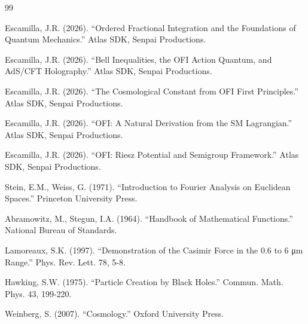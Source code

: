 \documentclass[12pt]{article}
\theoremstyle{definition}
\begin{document}
\begin{thebibliography}{99}

  Escamilla, J.R. (2026).
  ``Ordered Fractional Integration and the Foundations of Quantum Mechanics.''
  Atlas SDK, Senpai Productions.

  Escamilla, J.R. (2026).
  ``Bell Inequalities, the OFI Action Quantum, and AdS/CFT Holography.''
  Atlas SDK, Senpai Productions.

  Escamilla, J.R. (2026).
  ``The Cosmological Constant from OFI First Principles.''
  Atlas SDK, Senpai Productions.

  Escamilla, J.R. (2026).
  ``OFI: A Natural Derivation from the SM Lagrangian.''
  Atlas SDK, Senpai Productions.

  Escamilla, J.R. (2026).
  ``OFI: Riesz Potential and Semigroup Framework.''
  Atlas SDK, Senpai Productions.

  Stein, E.M., Weiss, G. (1971).
  ``Introduction to Fourier Analysis on Euclidean Spaces.''
  Princeton University Press.

  Abramowitz, M., Stegun, I.A. (1964).
  ``Handbook of Mathematical Functions.''
  National Bureau of Standards.

  Lamoreaux, S.K. (1997).
  ``Demonstration of the Casimir Force in the 0.6 to 6 μm Range.''
  Phys. Rev. Lett. 78, 5-8.

  Hawking, S.W. (1975).
  ``Particle Creation by Black Holes.''
  Commun. Math. Phys. 43, 199-220.

  Weinberg, S. (2007).
  ``Cosmology.''
  Oxford University Press.

\end{thebibliography}
\end{document}
